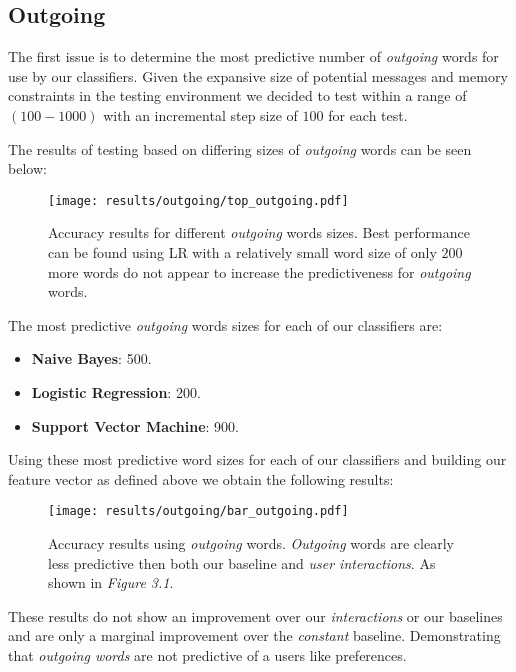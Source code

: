 \subsection{Outgoing}
\label{sec:id}

The first issue is to determine the most predictive number of \emph{outgoing} words for use by our classifiers. 
Given the expansive size of potential messages and memory constraints in the testing environment we decided to test within a range 
of $(100-1000)$ with an incremental step size of $100$ for each test.

The results of testing based on differing sizes of \emph{outgoing} words can be seen below:

\begin{figure}[h]
	\begin{center}
		\texttt{[image: results/outgoing/top\_outgoing.pdf]}
		\caption{Accuracy results for different \emph{outgoing} words sizes. Best performance can be found using LR with a relatively small word size of only $200$ more words do not appear to increase the predictiveness for \emph{outgoing} words.}
	\end{center}
\end{figure}

\clearpage

The most predictive \emph{outgoing} words sizes for each of our classifiers are:
\begin{itemize}
\item \textbf{Naive Bayes}: 500.
\item \textbf{Logistic Regression}: 200.
\item \textbf{Support Vector Machine}: 900.
\end{itemize}

Using these most predictive word sizes for each of our classifiers and building our feature vector as defined above we obtain the following results:

\begin{figure}[h]
	\begin{center}
		\texttt{[image: results/outgoing/bar\_outgoing.pdf]}
		\caption{Accuracy results using \emph{outgoing} words. \emph{Outgoing} words are clearly less predictive then both our baseline and \emph{user interactions}. As shown in \emph{Figure 3.1}.}
	\end{center}
\end{figure}

These results do not show an improvement over our \emph{interactions} or our baselines and are only a marginal improvement over the \emph{constant} baseline. 
Demonstrating that \emph{outgoing words} are not predictive of a users like preferences.

